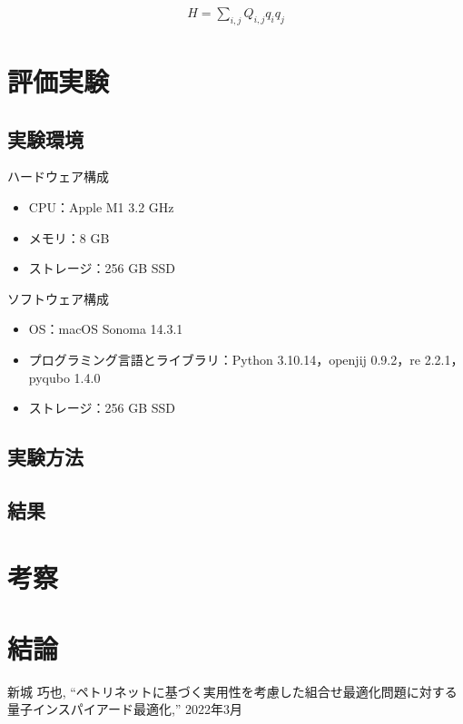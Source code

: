 \documentclass[conference]{IEEEtran}
\begin{document}
\begin{align}
H = \sum_{i,j} Q_{i,j} q_i q_j
\end{align}

\section{評価実験}
\subsection{実験環境}
ハードウェア構成
\begin{itemize}
\item CPU：Apple M1 3.2 GHz
\item メモリ：8 GB
\item ストレージ：256 GB SSD
\end{itemize}  

\vspace{\baselineskip}

ソフトウェア構成 
\begin{itemize}
\item OS：macOS Sonoma 14.3.1
\item プログラミング言語とライブラリ：Python 3.10.14，openjij 0.9.2，re 2.2.1，pyqubo 1.4.0
\item ストレージ：256 GB SSD
\end{itemize}

\subsection{実験方法}

\subsection{結果}

\section{考察}

\section{結論}

\begin{thebibliography}{00}
 新城 巧也, ``ペトリネットに基づく実用性を考慮した組合せ最適化問題に対する量子インスパイアード最適化,'' 2022年3月
\end{thebibliography}
\end{document}
